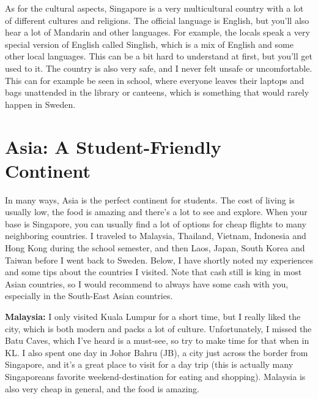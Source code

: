 As for the cultural aspects, Singapore is a very multicultural country with a lot of different cultures and religions. The official language is English, but you'll also hear a lot of Mandarin and other languages. For example, the locals speak a very special version of English called Singlish, which is a mix of English and some other local languages. This can be a bit hard to understand at first, but you'll get used to it. The country is also very safe, and I never felt unsafe or uncomfortable. This can for example be seen in school, where everyone leaves their laptops and bags unattended in the library or canteens, which is something that would rarely happen in Sweden. 
\vspace{-0.15cm}
\section*{Asia: A Student-Friendly Continent}
\label{asia}
\vspace{-0.1cm}
In many ways, Asia is the perfect continent for students. The cost of living is usually low, the food is amazing and there's a lot to see and explore. When your base is Singapore, you can usually find a lot of options for cheap flights to many neighboring countries. I traveled to Malaysia, Thailand, Vietnam, Indonesia and Hong Kong during the school semester, and then Laos, Japan, South Korea and Taiwan before I went back to Sweden. Below, I have shortly noted my experiences and some tips about the countries I visited. Note that cash still is king in most Asian countries, so I would recommend to always have some cash with you, especially in the South-East Asian countries.

\textbf{Malaysia:} I only visited Kuala Lumpur for a short time, but I really liked the city, which is both modern and packs a lot of culture. Unfortunately, I missed the Batu Caves, which I've heard is a must-see, so try to make time for that when in KL. I also spent one day in Johor Bahru (JB), a city just across the border from Singapore, and it's a great place to visit for a day trip (this is actually many Singaporeans favorite weekend-destination for eating and shopping). Malaysia is also very cheap in general, and the food is amazing.

